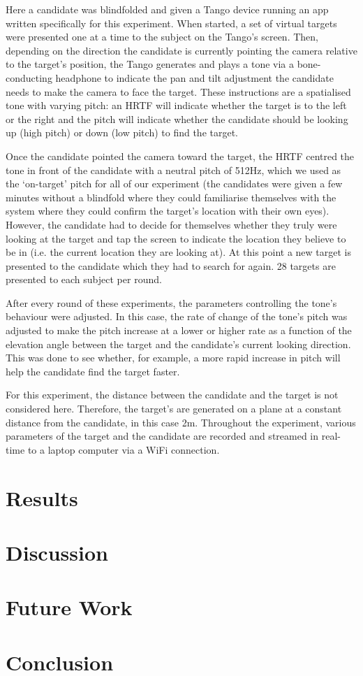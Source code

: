 \documentclass[format=sigconf, review=true, screen=true, anonymous=true]{acmart}
\begin{document}
Here a candidate was blindfolded and given a Tango device running an app written specifically for this experiment. When started, a set of virtual targets were presented one at a time to the subject on the Tango's screen. Then, depending on the direction the candidate is currently pointing the camera relative to the target's position, the Tango generates and plays a tone via a bone-conducting headphone to indicate the pan and tilt adjustment the candidate needs to make the camera to face the target. These instructions are a spatialised tone with varying pitch: an HRTF will indicate whether the target is to the left or the right and the pitch will indicate whether the candidate should be looking up (high pitch) or down (low pitch) to find the target. 

Once the candidate pointed the camera toward the target, the HRTF centred the tone in front of the candidate with a neutral pitch of 512Hz, which we used as the `on-target' pitch for all of our experiment (the candidates were given a few minutes without a blindfold where they could familiarise themselves with the system where they could confirm the target's location with their own eyes). However, the candidate had to decide for themselves whether they truly were looking at the target and tap the screen to indicate the location they believe to be in (i.e. the current location they are looking at). At this point a new target is presented to the candidate which they had to search for again. 28 targets are presented to each subject per round. 

After every round of these experiments, the parameters controlling the tone's behaviour were adjusted. In this case, the rate of change of the tone's pitch was adjusted to make the pitch increase at a lower or higher rate as a function of the elevation angle between the target and the candidate's current looking direction. This was done to see whether, for example, a more rapid increase in pitch will help the candidate find the target faster. 

For this experiment, the distance between the candidate and the target is not considered here. Therefore, the target's are generated on a plane at a constant distance from the candidate, in this case 2m. Throughout the experiment, various parameters of the target and the candidate are recorded and streamed in real-time to a laptop computer via a WiFi connection.

\section{Results}

\section{Discussion}

\section{Future Work}

\section{Conclusion}



\end{document}
